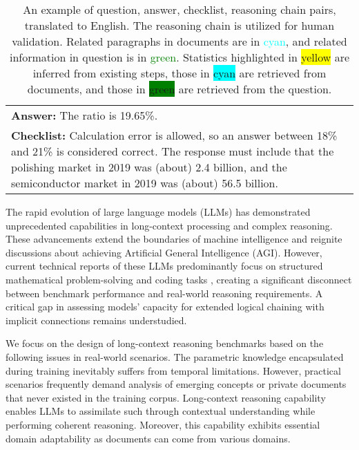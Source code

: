 \begin{table}[]
\begin{tabular}{p{7.5cm}}
\\
\textbf{Answer:} \small The ratio is 19.65\%.\\
\textbf{Checklist:} \small  Calculation error is allowed, so an answer between 18\% and 21\% is considered correct. 
The response must include that the polishing market in 2019 was (about) 2.4 billion, and the semiconductor market in 2019 was (about) 56.5 billion. \\
 \bottomrule
    \end{tabular}
    \caption{An example of question, answer, checklist, reasoning chain pairs, translated to English. The reasoning chain is utilized for human validation.
    Related paragraphs in documents are in \textcolor{cyan}{cyan}, and related information in question is in \textcolor{green}{green}.
    Statistics highlighted in \colorbox{yellow}{yellow} are inferred from existing steps, those in \colorbox{cyan}{cyan} are retrieved from documents, and those in \colorbox{green}{green} are retrieved from the question.}
    \label{tab:sample}
\end{table}

The rapid evolution of large language models (LLMs) \cite{openai_o1preview, claude35, deepseekai2025deepseekr1incentivizingreasoningcapability} has demonstrated unprecedented capabilities in long-context processing and complex reasoning. 
These advancements extend the boundaries of machine intelligence and reignite discussions about achieving Artificial General Intelligence (AGI). 
However, current technical reports of these LLMs predominantly focus on structured mathematical problem-solving \cite{MATH,lightman2023lets,AIME} and coding tasks \cite{LiveCodeBench}, creating a significant disconnect between benchmark performance and real-world reasoning requirements. 
A critical gap in assessing models' capacity for extended logical chaining with implicit connections remains understudied.


We focus on the design of long-context reasoning benchmarks based on the following issues in real-world scenarios. 
The parametric knowledge encapsulated during training inevitably suffers from temporal limitations. 
However, practical scenarios frequently demand analysis of emerging concepts or private documents that never existed in the training corpus. 
Long-context reasoning capability enables LLMs to assimilate such through contextual understanding while performing coherent reasoning.
Moreover, this capability exhibits essential domain adaptability as documents can come from various domains.

